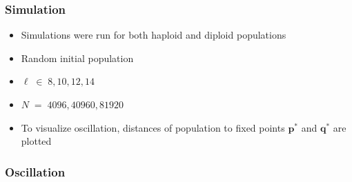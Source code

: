 \documentclass[aspectratio=169]{beamer}
\begin{document}
  \begin{frame}
    \frametitle{Simulation}
    \begin{itemize}
      \item{Simulations were run for both haploid and diploid populations}
      \item{Random initial population}     
      \item{$\ell \;\in\; {8, 10, 12, 14}$}
      \item{$N \;=\; {4096, 40960, 81920}$}
      \item{To visualize oscillation, distances of population to fixed points $\bm{p}^\ast$ and $\bm{q}^\ast$ are plotted}
    \end{itemize}
  \end{frame}
  
  \begin{frame}
    \frametitle{Oscillation}
    \begin{figure}[!h]
      \begin{center}
	 \hspace{-2.3em}%
	 \hspace{-2.3em}%

\end{center}
\end{figure}
\end{frame}
\end{document}
